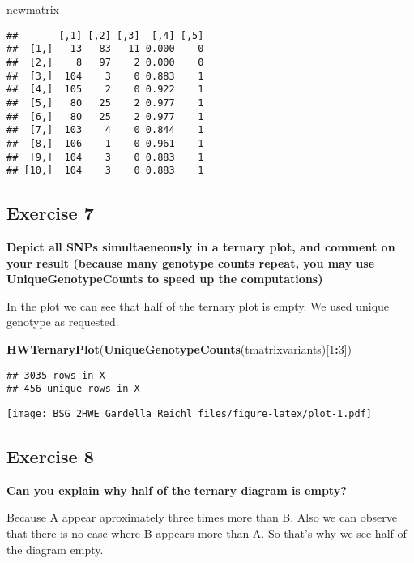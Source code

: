 \documentclass[]{article}
\newenvironment{Shaded}{\begin{snugshade}}{\end{snugshade}}
\newcommand{\KeywordTok}[1]{\textcolor[rgb]{0.13,0.29,0.53}{\textbf{#1}}}
\newcommand{\DecValTok}[1]{\textcolor[rgb]{0.00,0.00,0.81}{#1}}
\newcommand{\OperatorTok}[1]{\textcolor[rgb]{0.81,0.36,0.00}{\textbf{#1}}}
\newcommand{\NormalTok}[1]{#1}
\begin{document}
\begin{Shaded}
\begin{Highlighting}[]
\NormalTok{newmatrix}
\end{Highlighting}
\end{Shaded}

\begin{verbatim}
##       [,1] [,2] [,3]  [,4] [,5]
##  [1,]   13   83   11 0.000    0
##  [2,]    8   97    2 0.000    0
##  [3,]  104    3    0 0.883    1
##  [4,]  105    2    0 0.922    1
##  [5,]   80   25    2 0.977    1
##  [6,]   80   25    2 0.977    1
##  [7,]  103    4    0 0.844    1
##  [8,]  106    1    0 0.961    1
##  [9,]  104    3    0 0.883    1
## [10,]  104    3    0 0.883    1
\end{verbatim}

\subsection{Exercise 7}\label{exercise-7}

\textbf{Depict all SNPs simultaeneously in a ternary plot, and comment
on your result (because many genotype counts repeat, you may use
UniqueGenotypeCounts to speed up the computations)}

In the plot we can see that half of the ternary plot is empty. We used
unique genotype as requested.

\begin{Shaded}
\begin{Highlighting}[]
\KeywordTok{HWTernaryPlot}\NormalTok{(}\KeywordTok{UniqueGenotypeCounts}\NormalTok{(tmatrixvariants)[}\DecValTok{1}\OperatorTok{:}\DecValTok{3}\NormalTok{])}
\end{Highlighting}
\end{Shaded}

\begin{verbatim}
## 3035 rows in X
## 456 unique rows in X
\end{verbatim}

\texttt{[image: BSG\_2HWE\_Gardella\_Reichl\_files/figure-latex/plot-1.pdf]}

\subsection{Exercise 8}\label{exercise-8}

\textbf{Can you explain why half of the ternary diagram is empty?}

Because A appear aproximately three times more than B. Also we can
observe that there is no case where B appears more than A. So that's why
we see half of the diagram empty.
\end{document}

